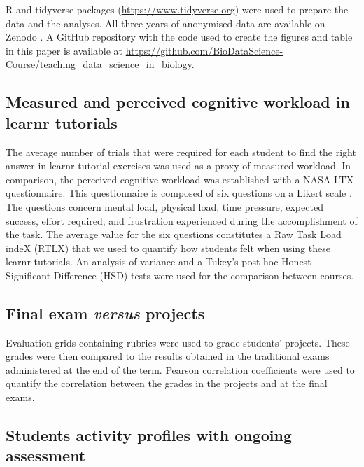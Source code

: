 \documentclass{aims}
\theoremstyle{definition}
\begin{document}
R and tidyverse \cite{Wickham2019} packages
(\url{https://www.tidyverse.org}) were used to prepare the data and the
analyses. All three years of anonymised data are available on Zenodo
\cite{Grosjeandataset2020, Grosjeandataset2019, Grosjeandataset2018}. A
GitHub repository with the code used to create the figures and table in
this paper is available at
\url{https://github.com/BioDataScience-Course/teaching_data_science_in_biology}.

\hypertarget{measured-and-perceived-cognitive-workload-in-learnr-tutorials}{%
\subsection{Measured and perceived cognitive workload in learnr
tutorials}\label{measured-and-perceived-cognitive-workload-in-learnr-tutorials}}

The average number of trials that were required for each student to find
the right answer in learnr tutorial exercises was used as a proxy of
measured workload. In comparison, the perceived cognitive workload was
established with a NASA LTX questionnaire. This questionnaire is
composed of six questions on a Likert scale \cite{Hart1988}. The
questions concern mental load, physical load, time pressure, expected
success, effort required, and frustration experienced during the
accomplishment of the task. The average value for the six questions
constitutes a Raw Task Load indeX (RTLX) \cite{Byers1989} that we used
to quantify how students felt when using these learnr tutorials. An
analysis of variance and a Tukey's post-hoc Honest Significant
Difference (HSD) tests were used for the comparison between courses.

\hypertarget{final-exam-versus-projects}{%
\subsection{\texorpdfstring{Final exam \emph{versus}
projects}{Final exam versus projects}}\label{final-exam-versus-projects}}

Evaluation grids containing rubrics were used to grade students'
projects. These grades were then compared to the results obtained in the
traditional exams administered at the end of the term. Pearson
correlation coefficients were used to quantify the correlation between
the grades in the projects and at the final exams.

\hypertarget{students-activity-profiles-with-ongoing-assessment}{%
\subsection{Students activity profiles with ongoing
assessment}\label{students-activity-profiles-with-ongoing-assessment}}
\end{document}
